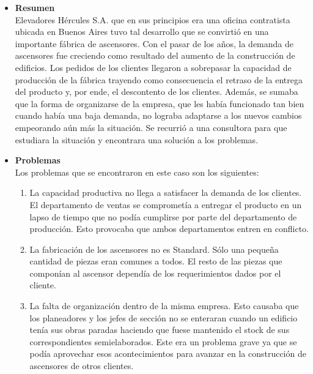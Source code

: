 \documentclass[a4paper,10pt,titlepage]{article}
\begin{document}
\begin{itemize}
 \item \textbf{Resumen}\\
      Elevadores H\'ercules S.A. que en sus principios era una oficina contratista ubicada en Buenos Aires tuvo tal desarrollo que se convirti\'o 
      en una importante f\'abrica de ascensores. Con el pasar de los a\~nos, la demanda de ascensores fue creciendo como resultado del aumento de 
      la construcci\'on de edificios. Los pedidos de los clientes llegaron a sobrepasar la capacidad de producci\'on de la f\'abrica trayendo como 
      consecuencia el retraso de la entrega del producto y, por ende, el descontento de los clientes. Adem\'as, se sumaba que la forma de 
      organizarse de la empresa, que les hab\'ia funcionado tan bien cuando hab\'ia una baja demanda, no lograba adaptarse a los nuevos cambios
      empeorando a\'un m\'as la situaci\'on. Se recurri\'o a una consultora para que estudiara la situaci\'on y encontrara una soluci\'on a los problemas.
 \item \textbf{Problemas}\\
      Los problemas que se encontraron en este caso son los siguientes:
      \begin{enumerate}
	\item La capacidad productiva no llega a satisfacer la demanda de los clientes. El departamento de ventas se compromet\'ia a entregar el 
	producto en un lapso de tiempo que no pod\'ia cumplirse por parte del departamento de producci\'on. Esto provocaba que ambos departamentos
	entren en conflicto.
	\item La fabricaci\'on de los ascensores no es Standard. S\'olo una peque\~na cantidad de piezas eran comunes a todos. El resto de las piezas 
	que compon\'ian al ascensor depend\'ia de los requerimientos dados por el cliente.
	\item La falta de organizaci\'on dentro de la misma empresa. Esto causaba que los planeadores y los jefes de secci\'on no se enteraran cuando 
	un edificio ten\'ia sus obras paradas haciendo que fuese mantenido el stock de sus correspondientes semielaborados. Este era un problema grave 
	ya que se pod\'ia aprovechar esos acontecimientos para avanzar en la construcci\'on de ascensores de otros clientes.
      \end{enumerate}

\end{itemize}
\end{document}
